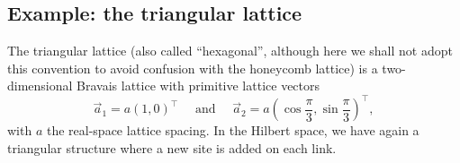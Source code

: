 \documentclass[prl,aps,twocolumn,showpacs,superscriptaddress,longbibliography]{revtex4-1}
\newcommand{\be}{\begin{equation}}
\newcommand{\ee}{\end{equation}}
\newcommand{\mand}{\quad\text{ and }\quad}
\newcommand{\lt}{\left(}
\newcommand{\rt}{\right)}
\begin{document}
 





\subsection{Example: the triangular lattice}

The triangular lattice (also called ``hexagonal'', although here we shall not adopt this convention to avoid confusion with the honeycomb lattice) is a two-dimensional Bravais lattice with primitive lattice vectors
\be
	\vec{a}_1 = a \lt 1,0   \rt^\intercal \mand \vec{a}_2 = a \lt \cos \frac{\pi}{3}, \sin \frac{\pi}{3}   \rt^\intercal ,
\ee
with $a$ the real-space lattice spacing. In the Hilbert space, we have again a triangular structure where a new site is added on each link. 
\end{document}
